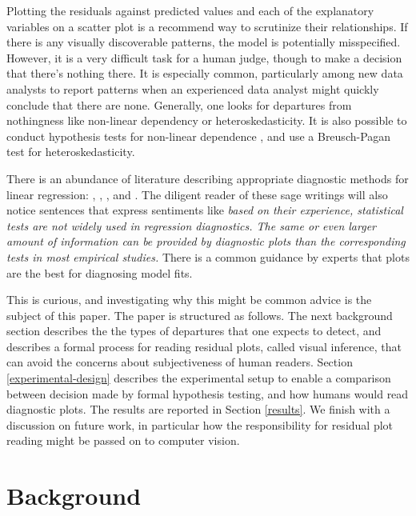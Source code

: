 \documentclass[]{interact}
\theoremstyle{plain}%
\theoremstyle{definition}
\theoremstyle{remark}
\begin{document}
Plotting the residuals against predicted values and each of the
explanatory variables on a scatter plot is a recommend way to scrutinize
their relationships. If there is any visually discoverable patterns, the
model is potentially misspecified. However, it is a very difficult task
for a human judge, though to make a decision that there's nothing there.
It is especially common, particularly among new data analysts to report
patterns when an experienced data analyst might quickly conclude that
there are none. Generally, one looks for departures from nothingness
like non-linear dependency or heteroskedasticity. It is also possible to
conduct hypothesis tests for non-linear dependence
\citep{ramsey_tests_1969}, and use a Breusch-Pagan test
\citep{breusch_simple_1979} for heteroskedasticity.

There is an abundance of literature describing appropriate diagnostic
methods for linear regression: \citet{draper1998applied},
\citet{montgomery1982introduction}, \citet{belsley_regression_1980},
\citet{cook_applied_1999} and \citet{cook1982residuals}. The diligent
reader of these sage writings will also notice sentences that express
sentiments like \emph{based on their experience, statistical tests are
not widely used in regression diagnostics. The same or even larger
amount of information can be provided by diagnostic plots than the
corresponding tests in most empirical studies.} There is a common
guidance by experts that plots are the best for diagnosing model fits.

This is curious, and investigating why this might be common advice is
the subject of this paper. The paper is structured as follows. The next
background section describes the the types of departures that one
expects to detect, and describes a formal process for reading residual
plots, called visual inference, that can avoid the concerns about
subjectiveness of human readers. Section \ref{experimental-design}
describes the experimental setup to enable a comparison between decision
made by formal hypothesis testing, and how humans would read diagnostic
plots. The results are reported in Section \ref{results}. We finish with
a discussion on future work, in particular how the responsibility for
residual plot reading might be passed on to computer vision.

\hypertarget{background}{%
\section{Background}\label{background}}
\end{document}
